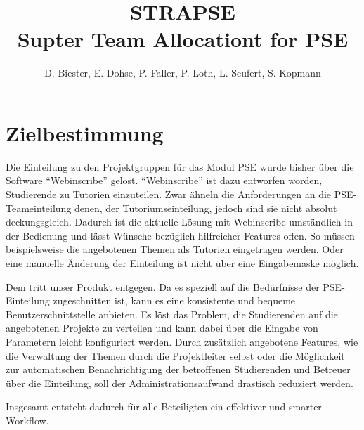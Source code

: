 \documentclass[parskip=full]{scrartcl}
\begin{document}
\title{\textbf{STRAPSE}\\
        \large Supter Team Allocationt for PSE}

\author{D. Biester, E. Dohse, P. Faller, P. Loth, L. Seufert, S. Kopmann}
        
\maketitle
 
\pagebreak
\tableofcontents
\pagebreak

\section{Zielbestimmung}

Die Einteilung zu den Projektgruppen für das Modul \gls{PSE} wurde bisher über die Software \enquote{Webinscribe} gelöst.
\enquote{Webinscribe} ist dazu entworfen worden, Studierende zu Tutorien einzuteilen.
Zwar ähneln die Anforderungen an die PSE-Teameinteilung denen, der Tutoriumseinteilung,
jedoch sind sie nicht absolut deckungsgleich. 
Dadurch ist die aktuelle Lösung mit Webinscribe umständlich in der Bedienung und lässt Wünsche bezüglich hilfreicher Features offen.
So müssen beispielsweise die angebotenen Themen als Tutorien eingetragen werden. 
Oder eine manuelle Änderung der Einteilung ist nicht über eine Eingabemaske möglich.

Dem tritt unser Produkt entgegen.
Da es speziell auf die Bedürfnisse der PSE-Einteilung zugeschnitten ist, 
kann es eine konsistente und bequeme Benutzerschnittstelle anbieten.
Es löst das Problem, die Studierenden auf die angebotenen Projekte zu verteilen und kann dabei über die Eingabe von Parametern leicht konfiguriert werden.
Durch zusätzlich angebotene Features, wie die Verwaltung der Themen durch die Projektleiter selbst 
oder die Möglichkeit zur automatischen Benachrichtigung der betroffenen Studierenden und Betreuer über die
Einteilung, soll der Administrationsaufwand drastisch reduziert werden. 

Insgesamt entsteht dadurch für alle Beteiligten ein effektiver und smarter Workflow.
\end{document}
